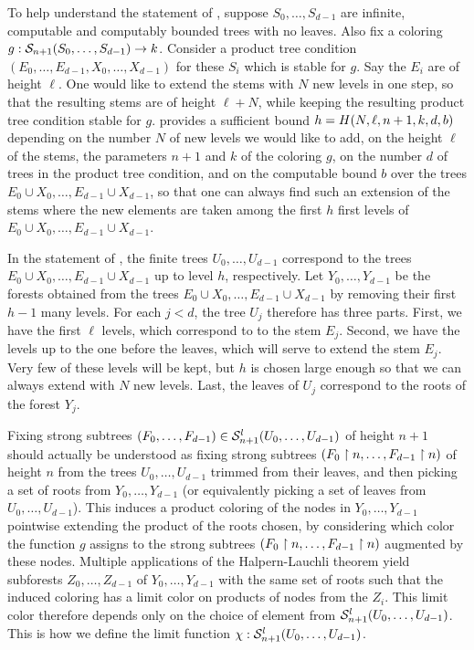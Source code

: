 To help understand the statement of ,
suppose $S_0, \dots, S_{d-1}$ are infinite, computable and computably bounded trees with no leaves. Also fix a coloring $g: \mathcal{S}_{n+1}({S_0, \dots, S_{d-1}}) \to k$.
Consider a product tree condition $(E_0, \dots, E_{d-1}, X_0, \dots, X_{d-1})$ for these $S_i$ which is stable for $g$. Say the $E_i$ are of height $\ell$. One would like to extend the stems with $N$ new levels in one step, so that the resulting stems are of height $\ell+N$, while keeping the resulting product tree condition stable for $g$. 
 provides a sufficient bound $h = H(N,\ell,n+1,k,d,b)$ depending on the number $N$ of new levels we would like to add, on the height $\ell$ of the stems, the parameters $n+1$ and $k$ of the coloring $g$,
on the number $d$ of trees in the product tree condition, and on the computable bound $b$ over the trees $E_0 \cup X_0, \dots, E_{d-1} \cup X_{d-1}$,
 	so that one can always find such an extension of the stems where the new elements are taken among the first $h$ first levels of  $E_0 \cup X_0, \dots, E_{d-1} \cup X_{d-1}$.
 	
 In the statement of , the finite trees $U_0, \dots, U_{d-1}$
 correspond to the trees $E_0 \cup X_0, \dots, E_{d-1} \cup X_{d-1}$ up to level $h$, respectively. 
  Let $Y_0, \dots, Y_{d-1}$ be the forests obtained from the trees $E_0 \cup X_0, \dots, E_{d-1} \cup X_{d-1}$ by removing their first $h-1$ many levels.
 For each $j < d$, the tree $U_j$ therefore has three parts. First, we have the first $\ell$ levels, which correspond to to the stem $E_j$. Second, we have the levels up to the one before the leaves, which will serve to extend the stem $E_j$. Very few of these levels will be kept, but $h$ is chosen large enough so that we can always extend with $N$ new levels. Last, the leaves of $U_j$ correspond to the roots of the forest $Y_j$.
 
Fixing strong subtrees $(F_0, \dots, F_{d-1}) \in \mathcal{S}^{l}_{n+1}({U_0, \dots, U_{d-1}})$ of height $n+1$ should actually be understood as fixing strong subtrees $(F_0 \upharpoonright n, \dots, F_{d-1} \upharpoonright n)$ of height $n$ from the trees $U_0, \dots, U_{d-1}$ trimmed from their leaves,
and then picking a set of roots from $Y_0, \dots, Y_{d-1}$ (or equivalently picking a set of leaves from $U_0, \dots, U_{d-1}$). This induces a product coloring of the nodes in $Y_0, \dots, Y_{d-1}$ pointwise extending the product of the roots chosen, by considering which color the function $g$ assigns to the strong subtrees $(F_0 \upharpoonright n, \dots, F_{d-1} \upharpoonright n)$ augmented by these nodes. Multiple applications of the Halpern-Lauchli theorem yield subforests $Z_0, \dots, Z_{d-1}$ of $Y_0, \dots, Y_{d-1}$ with the same set of roots such that the induced coloring has a limit color on products of nodes from the $Z_i$.
This limit color therefore depends only on the choice of element from $\mathcal{S}^{l}_{n+1}({U_0, \dots, U_{d-1}})$. This is how we define the limit function $\chi: \mathcal{S}^{l}_{n+1}({U_0, \dots, U_{d-1}})$.


